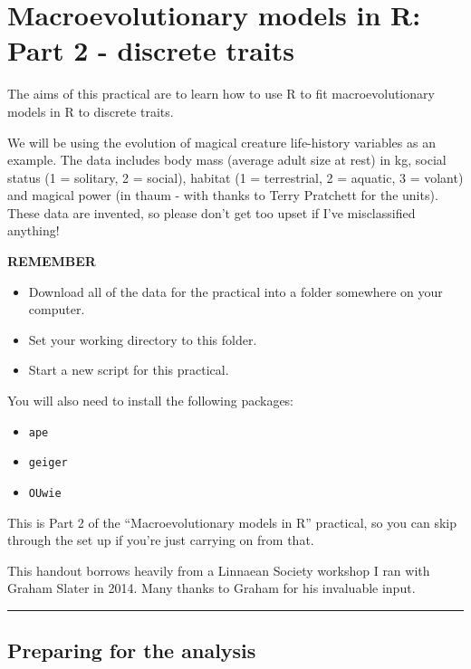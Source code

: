 \documentclass[]{book}
\providecommand{\tightlist}{%
  \setlength{\itemsep}{0pt}\setlength{\parskip}{0pt}}
\theoremstyle{definition}
\theoremstyle{definition}
\theoremstyle{definition}
\theoremstyle{remark}
\begin{document}
\chapter{Macroevolutionary models in R: Part 2 - discrete
traits}\label{macroevolutionary-models-in-r-part-2---discrete-traits}

The aims of this practical are to learn how to use R to fit
macroevolutionary models in R to discrete traits.

We will be using the evolution of magical creature life-history
variables as an example. The data includes body mass (average adult size
at rest) in kg, social status (1 = solitary, 2 = social), habitat (1 =
terrestrial, 2 = aquatic, 3 = volant) and magical power (in thaum - with
thanks to Terry Pratchett for the units). These data are invented, so
please don't get too upset if I've misclassified anything!

\textbf{REMEMBER}

\begin{itemize}
\tightlist
\item
  Download all of the data for the practical into a folder somewhere on
  your computer.
\item
  Set your working directory to this folder.
\item
  Start a new script for this practical.
\end{itemize}

You will also need to install the following packages:

\begin{itemize}
\tightlist
\item
  \texttt{ape}
\item
  \texttt{geiger}
\item
  \texttt{OUwie}
\end{itemize}

This is Part 2 of the ``Macroevolutionary models in R'' practical, so
you can skip through the set up if you're just carrying on from that.

This handout borrows heavily from a Linnaean Society workshop I ran with
Graham Slater in 2014. Many thanks to Graham for his invaluable input.

\begin{center}\rule{0.5\linewidth}{\linethickness}\end{center}

\section{Preparing for the analysis}\label{preparing-for-the-analysis-2}
\end{document}
